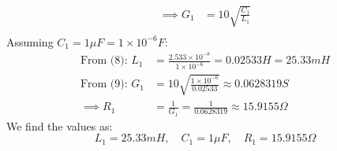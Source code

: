 \begin{enumerate}
\begin{align*}
      \implies G_1 &= 10 \sqrt{\frac{C_1}{L_1}} \tag{9} \\
    \end{align*}
    Assuming \(C_1 = 1 \mu F = 1 \times 10^{-6} F\):
    \begin{align*}
      \text{From (8): } L_1 &= \frac{2.533 \times 10^{-8}}{1 \times 10^{-6}} = 0.02533 H = 25.33 mH \\
      \text{From (9): } G_1 &= 10 \sqrt{\frac{1 \times 10^{-6}}{0.02533}} \approx 0.0628319 S \\
      \implies R_1 &= \frac{1}{G_1} = \frac{1}{0.0628319} \approx 15.9155 \Omega
    \end{align*}
    We find the values as:
    \[
      L_1 = 25.33 mH, \quad C_1 = 1 \mu F, \quad R_1 = 15.9155 \Omega
    \]
\end{enumerate}
